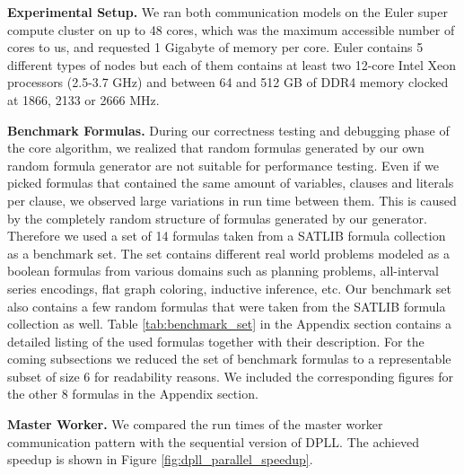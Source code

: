 \documentclass[letterpaper]{article}
\newcommand{\mypar}[1]{{\bf #1.}}
\begin{document}
\mypar{Experimental Setup}
We ran both communication models on the Euler super compute cluster \cite{euler} on up to 48 cores, which was the maximum accessible number of cores to us, and requested 1 Gigabyte of memory per core. Euler contains 5 different types of nodes but each of them contains at least two 12-core Intel Xeon processors (2.5-3.7 GHz) and between 64 and 512 GB of DDR4 memory clocked at 1866, 2133 or 2666 MHz.

\mypar{Benchmark Formulas}
During our correctness testing and debugging phase of the core algorithm, we realized that random formulas generated by our own random formula generator are not suitable for performance testing.
Even if we picked formulas that contained the same amount of variables, clauses and literals per clause, we observed large variations in run time between them.
This is caused by the completely random structure of formulas generated by our generator.
Therefore we used a set of 14 formulas taken from a SATLIB formula collection as a benchmark set.
The set contains different real world problems modeled as a boolean formulas from various domains such as planning problems,
all-interval series encodings, flat graph coloring, inductive inference, etc.
Our benchmark set also contains a few random formulas that were taken from the SATLIB formula collection as well.
Table \ref{tab:benchmark_set} in the Appendix section contains a detailed listing of the used formulas together with their description.
For the coming subsections we reduced the set of benchmark formulas to a representable subset of size 6 for readability reasons.
We included the corresponding figures for the other 8 formulas in the Appendix section.

\mypar{Master Worker}
We compared the run times of the master worker communication pattern with the sequential version of DPLL.
The achieved speedup is shown in Figure \ref{fig:dpll_parallel_speedup}.
\end{document}

